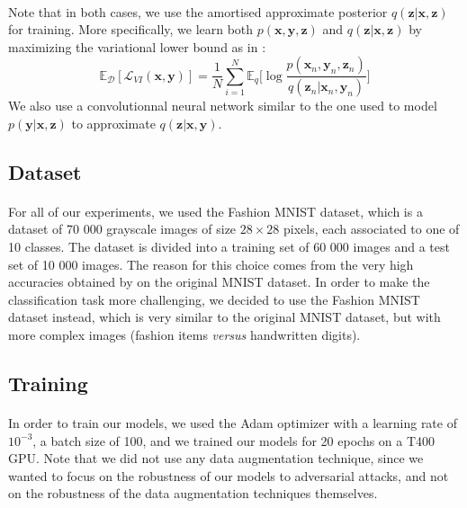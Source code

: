 \documentclass[11pt,twocolumn,letterpaper]{article}
\begin{document}
\paragraph{} Note that in both cases, we use the amortised approximate posterior $q(\bm{z}|\bm{x}, \bm{z})$ for training. More specifically, we learn both $p(\bm{x}, \bm{y}, \bm{z})$ and $q(\bm{z}|\bm{x}, \bm{z})$ by maximizing the variational lower bound as in \cite{auto_encoding_variational_bayes}:
\[ \mathbb{E}_{\mathcal{D}}[\mathcal{L}_{VI}(\bm{x}, \bm{y})] = \frac{1}{N} \sum \limits_{i=1}^N \mathbb{E}_q \Big[ \log{\frac{p(\bm{x}_n, \bm{y}_n, \bm{z}_n)}{q(\bm{z}_n|\bm{x}_n, \bm{y}_n)}} \Big] \]
We also use a convolutionnal neural network similar to the one used to model $p(\bm{y}|\bm{x}, \bm{z})$ to approximate $q(\bm{z}|\bm{x}, \bm{y})$.

\subsection{Dataset}

\paragraph{} For all of our experiments, we used the Fashion MNIST dataset, which is a dataset of 70 000 grayscale images of size $28 \times 28$ pixels, each associated to one of 10 classes. The dataset is divided into a training set of 60 000 images and a test set of 10 000 images. The reason for this choice comes from the very high accuracies obtained by \cite{main_paper} on the original MNIST dataset. In order to make the classification task more challenging, we decided to use the Fashion MNIST dataset instead, which is very similar to the original MNIST dataset, but with more complex images (fashion items \textit{versus} handwritten digits).

\subsection{Training} 

\paragraph{} In order to train our models, we used the Adam optimizer with a learning rate of $10^{-3}$, a batch size of 100, and we trained our models for 20 epochs on a T400 GPU. Note that we did not use any data augmentation technique, since we wanted to focus on the robustness of our models to adversarial attacks, and not on the robustness of the data augmentation techniques themselves. 
\end{document}
